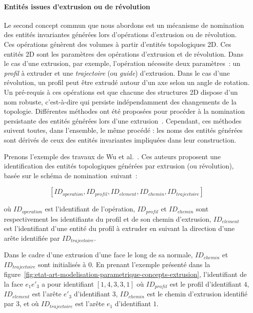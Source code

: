 

\paragraph*{Entités issues d'extrusion ou de révolution}


Le second concept commun que nous abordons est un mécanisme de nomination des entités invariantes
générées lors d'opérations d'extrusion ou de révolution. %
Ces opérations génèrent des volumes à partir d'entités topologiques 2D. %
Ces entités 2D sont les paramètres des opérations d'extrusion et de
révolution. %
Dans le cas d'une extrusion, par exemple, l'opération nécessite deux paramètres~:  un \emph{profil} à extruder et une \emph{trajectoire} (ou \emph{guide})
d'extrusion. %
Dans le cas d'une révolution, un profil peut être extrudé autour d'un axe selon
un angle de rotation. %
Un pré-requis à ces opérations est que chacune des structures 2D dispose d'un
nom robuste, c'est-à-dire qui persiste indépendamment des changements de la
topologie. %
Différentes méthodes ont été proposées pour procéder à la nomination persistante
des entités générées lors d'une
extrusion~\cite{chen1995representation,wu2001face,agbodan2003topological}. %
Cependant, ces méthodes suivent toutes, dans l'ensemble, le même procédé : les noms des entités générées sont dérivés de ceux des entités invariantes impliquées dans leur construction. %


Prenons l'exemple des travaux de Wu et al.~\cite{wu2001face}. %
Ces auteurs proposent une identification des entités topologiques générées par extrusion (ou
révolution), basée sur le schéma de nomination~suivant~:

\[[ID_{operation},ID_{profil},ID_{element},ID_{chemin},ID_{trajectoire}]\]

où $ID_{operation}$ est l'identifiant de l'opération, $ID_{profil}$ et $ID_{chemin}$ sont
respectivement les identifiants du profil et de son chemin d'extrusion,
$ID_{element}$ est l'identifiant d'une entité du profil à extruder en
suivant la direction d'une arête identifiée par $ID_{trajectoire}$. %

Dans le cadre d'une extrusion d'une face le long de sa normale, $ID_{chemin}$ et
$ID_{trajectoire}$ sont initialisés à $0$. %
En prenant l'exemple présenté dans la
figure~\ref{fig:etat-art-modelisation-parametrique-concepts-extrusion},
l'identifiant de la face $e_{1}e'_{3}$ a pour identifiant \([1,4,3,3,1]\) où
$ID_{profil}$ est le profil d'identifiant $4$, $ID_{element}$ est l'arête $e'_{3}$
d'identifiant $3$, $ID_{chemin}$ est le chemin d'extrusion  identifié par $3$, et
où $ID_{trajectoire}$ est l'arête $e_{1}$ d'identifiant $1$. %


